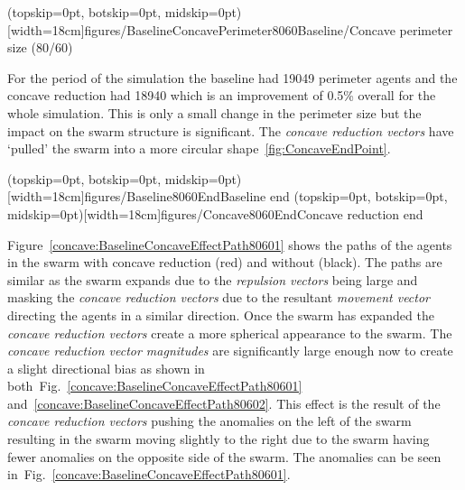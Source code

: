 \documentclass{ieeeaccess}
\begin{document}
\Figure[t!](topskip=0pt, botskip=0pt, midskip=0pt)[width=18cm]{figures/BaselineConcavePerimeter8060}{Baseline/Concave perimeter size (80/60)\label{concave:BaselineConcavePerimeter8060}}

For the period of the simulation the baseline had 19049 perimeter agents and the concave reduction had 18940 which is an improvement of 0.5\% overall for the whole simulation. This is only a small change in the perimeter size but the impact on the swarm structure is significant. The \textit{concave reduction vectors} have `pulled' the swarm into a more circular shape~\ref{fig:ConcaveEndPoint}.

\Figure[t!](topskip=0pt, botskip=0pt, midskip=0pt)[width=18cm]{figures/Baseline8060End}{Baseline end\label{fig:BaselineEndPoint}}
\Figure[t!](topskip=0pt, botskip=0pt, midskip=0pt)[width=18cm]{figures/Concave8060End}{Concave reduction end\label{fig:ConcaveEndPoint}}

Figure~\ref{concave:BaselineConcaveEffectPath80601} shows the paths of the agents in the swarm with concave reduction (red) and without (black). The paths are similar as the swarm expands due to the \textit{repulsion vectors} being large and masking the \textit{concave reduction vectors} due to the resultant \textit{movement vector} directing the agents in a similar direction. Once the swarm has expanded the \textit{concave reduction vectors} create a more spherical appearance to the swarm. The \textit{concave reduction vector magnitudes} are significantly large enough now to create a slight directional bias as shown in both~Fig.~\ref{concave:BaselineConcaveEffectPath80601} and~\ref{concave:BaselineConcaveEffectPath80602}. This effect is the result of the \textit{concave reduction vectors} pushing the anomalies on the left of the swarm resulting in the swarm moving slightly to the right due to the swarm having fewer anomalies on the opposite side of the swarm. The anomalies can be seen in~Fig.~\ref{concave:BaselineConcaveEffectPath80601}.
\end{document}
